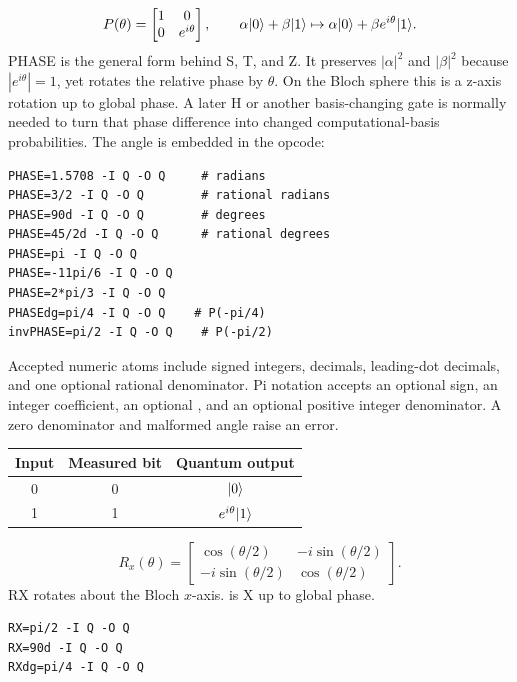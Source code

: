\[
P(\theta)=\begin{bmatrix}1&0\\0&e^{i\theta}\end{bmatrix},\qquad
\alpha\lvert 0\rangle+\beta\lvert 1\rangle\mapsto
\alpha\lvert 0\rangle+\beta e^{i\theta}\lvert 1\rangle.
\]
PHASE is the general form behind S, T, and Z. It preserves
$|\alpha|^2$ and $|\beta|^2$ because $|e^{i\theta}|=1$, yet rotates the
relative phase by $\theta$. On the Bloch sphere this is a z-axis rotation up to
global phase. A later H or another basis-changing gate is normally needed to
turn that phase difference into changed computational-basis probabilities.
The angle is embedded in the opcode:
\begin{lstlisting}
PHASE=1.5708 -I Q -O Q     # radians
PHASE=3/2 -I Q -O Q        # rational radians
PHASE=90d -I Q -O Q        # degrees
PHASE=45/2d -I Q -O Q      # rational degrees
PHASE=pi -I Q -O Q
PHASE=-11pi/6 -I Q -O Q
PHASE=2*pi/3 -I Q -O Q
PHASEdg=pi/4 -I Q -O Q    # P(-pi/4)
invPHASE=pi/2 -I Q -O Q    # P(-pi/2)
\end{lstlisting}
Accepted numeric atoms include signed integers, decimals, leading-dot decimals,
and one optional rational denominator. Pi notation accepts an optional sign,
an integer coefficient, an optional \code{*}, and an optional positive integer
denominator. A zero denominator and malformed angle raise an error.

\begin{center}
\begin{tabular}{ccc}\toprule Input & Measured bit & Quantum output\\\midrule
0 & 0 & $\lvert 0\rangle$\\
1 & 1 & $e^{i\theta}\lvert 1\rangle$\\\bottomrule\end{tabular}
\end{center}


\[
R_x(\theta)=\begin{bmatrix}
\cos(\theta/2)&-i\sin(\theta/2)\\
-i\sin(\theta/2)&\cos(\theta/2)
\end{bmatrix}.
\]
RX rotates about the Bloch $x$-axis.  is X up to global phase.
\begin{lstlisting}
RX=pi/2 -I Q -O Q
RX=90d -I Q -O Q
RXdg=pi/4 -I Q -O Q
\end{lstlisting}


